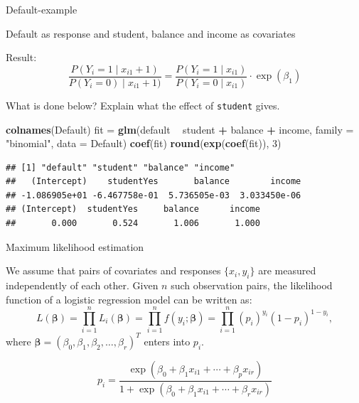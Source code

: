 \documentclass[10pt,ignorenonframetext,]{beamer}
\newenvironment{Shaded}{\begin{snugshade}}{\end{snugshade}}
\newcommand{\KeywordTok}[1]{\textcolor[rgb]{0.13,0.29,0.53}{\textbf{#1}}}
\newcommand{\DataTypeTok}[1]{\textcolor[rgb]{0.13,0.29,0.53}{#1}}
\newcommand{\DecValTok}[1]{\textcolor[rgb]{0.00,0.00,0.81}{#1}}
\newcommand{\StringTok}[1]{\textcolor[rgb]{0.31,0.60,0.02}{#1}}
\newcommand{\OperatorTok}[1]{\textcolor[rgb]{0.81,0.36,0.00}{\textbf{#1}}}
\newcommand{\NormalTok}[1]{#1}
\begin{document}
\begin{frame}[fragile]

\begin{block}{Default-example}

Default as response and student, balance and income as covariates

Result:
\[\frac{P(Y_i=1\mid x_{i1}+1)}{P(Y_i=0)\mid x_{i1}+1)}=\frac{P(Y_i=1\mid x_{i1})}{P(Y_i=0\mid x_{i1})}\cdot \exp(\beta_1)\]

What is done below? Explain what the effect of \texttt{student} gives.

\footnotesize

\begin{Shaded}
\begin{Highlighting}[]
\KeywordTok{colnames}\NormalTok{(Default)}
\NormalTok{fit =}\StringTok{ }\KeywordTok{glm}\NormalTok{(default }\OperatorTok{~}\StringTok{ }\NormalTok{student }\OperatorTok{+}\StringTok{ }\NormalTok{balance }\OperatorTok{+}\StringTok{ }\NormalTok{income, }\DataTypeTok{family =} \StringTok{"binomial"}\NormalTok{, }
    \DataTypeTok{data =}\NormalTok{ Default)}
\KeywordTok{coef}\NormalTok{(fit)}
\KeywordTok{round}\NormalTok{(}\KeywordTok{exp}\NormalTok{(}\KeywordTok{coef}\NormalTok{(fit)), }\DecValTok{3}\NormalTok{)}
\end{Highlighting}
\end{Shaded}

\begin{verbatim}
## [1] "default" "student" "balance" "income" 
##   (Intercept)    studentYes       balance        income 
## -1.086905e+01 -6.467758e-01  5.736505e-03  3.033450e-06 
## (Intercept)  studentYes     balance      income 
##       0.000       0.524       1.006       1.000
\end{verbatim}

\normalsize

\end{block}

\end{frame}

\begin{frame}

\begin{block}{Maximum likelihood estimation}

We assume that pairs of covariates and responses \(\{x_i, y_i\}\) are
measured independently of each other. Given \(n\) such observation
pairs, the likelihood function of a logistic regression model can be
written as:
\[L(\boldsymbol{\beta}) = \prod_{i=1}^n L_i(\boldsymbol{\beta}) = \prod_{i=1}^n f(y_i; \boldsymbol{\beta}) = \prod_{i=1}^n (p_i)^{y_i}(1-p_i)^{1-y_i},\]
where
\(\boldsymbol{\beta} = (\beta_0, \beta_1, \beta_2, \ldots, \beta_r)^T\)
enters into \(p_i\).

\[p_i= \frac{\exp(\beta_0+\beta_1 x_{i1}+\cdots + \beta_p x_{ir})}{1 + \exp(\beta_0 + \beta_1 x_{i1}+\cdots+\beta_r x_{ir})}\]

\end{block}

\end{frame}
\end{document}

